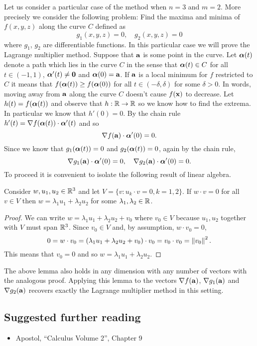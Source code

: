 Let us consider a particular case of the method when \(n=3\) and \(m=2\).
More precisely we consider the following problem:
Find the maxima and minima of \(f(x,y,z)\) along the curve \(C\) defined as
\[
    g_1(x,y,z) = 0,
    \quad
    g_2(x,y,z) = 0
\]
where \(g_1\), \(g_2\) are differentiable functions.
In this particular case we will prove the Lagrange multiplier method.
Suppose that \(\aa\) is some point in the curve.
Let \(\aalpha(t)\) denote a path which lies in the curve \(C\) in the sense that \(\aalpha(t) \in C\) for all \(t\in (-1,1)\), \(\aalpha'(t)\neq \mathbf{0}\) and \(\aalpha(0)=\aa\).
If \(\aa\) is a local minimum for \(f\) restricted to \(C\) it means that \(f(\aalpha(t))\geq f(\aalpha(0))\) for all \(t \in (-\delta,\delta)\) for some \(\delta>0\).
In words, moving away from \(\aa\) along the curve \(C\) doesn't cause \(f(\xx)\) to decrease.
Let \(h(t) = f(\aalpha(t))\) and observe that \(h:\bR \to \bR\) so we know how to find the extrema.
In particular we know that \(h'(0)=0\).
By the chain rule \(h'(t) = \nabla f(\aalpha(t))\cdot \aalpha'(t)\) and so
\[
    \nabla f(\aa)\cdot \aalpha'(0) = 0.
\]
Since we know that \(g_1(\aalpha(t))=0\) and \(g_2(\aalpha(t))=0\), again by the chain rule,
\[
    \nabla g_1(\aa)\cdot \aalpha'(0) = 0,
    \quad
    \nabla g_2(\aa)\cdot \aalpha'(0) = 0.
\]
To proceed it is convenient to isolate the following result of linear algebra.
\begin{lemma*}
    Consider \(w, u_1,u_2 \in \bR^3\) and let \(V = \{v : u_k \cdot v = 0, k =1,2\}\).
    If \(w\cdot v =0\) for all \(v \in V\) then \(w = \lambda_1 u_1 + \lambda_2 u_2\) for some \(\lambda_1,\lambda_2 \in \bR\).
\end{lemma*}
\begin{proof}
    We can write \(w = \lambda_1 u_1 + \lambda_2 u_2 + v_0\) where \(v_0 \in V\) because \(u_1, u_2\) together with \(V\) must span \(\bR^3\).
    Since \(v_0 \in V\) and, by assumption, \(w\cdot v_0 = 0\),
    \[
        0 = w\cdot v_0
        = (\lambda_1 u_1 + \lambda_2 u_2 + v_0)\cdot v_0
        = v_0\cdot v_0
        = \norm{v_0}^2.
    \]
    This means that \(v_0 =0\) and so \(w = \lambda_1 u_1 + \lambda_2 u_2\).
\end{proof}

The above lemma also holds in any dimension with any number of vectors with the analogous proof.
Applying this lemma to the vectors \(\nabla f(\aa)\), \(\nabla g_1(\aa)\) and \(\nabla g_2(\aa)\) recovers exactly the Lagrange multiplier method in this setting.


\subsection*{Suggested further reading}

\begin{itemize}
    \item Apostol, ``Calculus Volume 2'', Chapter 9
\end{itemize}

